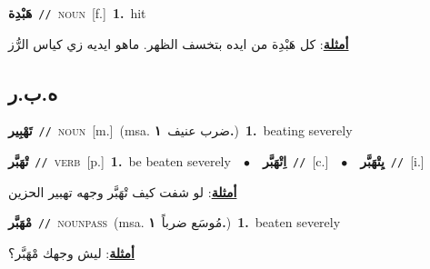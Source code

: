 \documentclass[10pt,a4paper,twoside]{article} %
\begin{document}
\begin{multicols}{2}
{\setlength\topsep{0pt}\textbf{\foreignlanguage{arabic}{هَبْدِة}}\ {\color{gray}\texttt{//}\color{black}}\ \textsc{noun}\ [f.]\ \textbf{1.}~hit\  \begin{flushright}\color{gray}\foreignlanguage{arabic}{\textbf{\underline{\foreignlanguage{arabic}{أمثلة}}}: كل هَبْدِة من ايده بتخسف الظهر. ماهو ايديه زي كياس الرُّز}\end{flushright}\color{black}} \vspace{2mm}

\vspace{-3mm}
\subsection*{\color{blue}\foreignlanguage{arabic}{ه.ب.ر}\color{blue}{}} 

{\setlength\topsep{0pt}\textbf{\foreignlanguage{arabic}{تَهْبِير}}\ {\color{gray}\texttt{//}\color{black}}\ \textsc{noun}\ [m.]\ \color{gray}(msa. \foreignlanguage{arabic}{ضرب عنيف}~\foreignlanguage{arabic}{\textbf{١.}})\color{black}\ \textbf{1.}~beating severely\ } \vspace{2mm}

{\setlength\topsep{0pt}\textbf{\foreignlanguage{arabic}{تْهَبَّر}}\ {\color{gray}\texttt{//}\color{black}}\ \textsc{verb}\ [p.]\ \textbf{1.}~be beaten severely\ \ $\bullet$\ \ \setlength\topsep{0pt}\textbf{\foreignlanguage{arabic}{اِتْهَبَّر}}\ {\color{gray}\texttt{//}\color{black}}\ [c.]\ \ $\bullet$\ \ \setlength\topsep{0pt}\textbf{\foreignlanguage{arabic}{يِتْهَبَّر}}\ {\color{gray}\texttt{//}\color{black}}\ [i.]\  \begin{flushright}\color{gray}\foreignlanguage{arabic}{\textbf{\underline{\foreignlanguage{arabic}{أمثلة}}}: لو شفت كيف تْهَبَّر وجهه تهبير الحزين}\end{flushright}\color{black}} \vspace{2mm}

{\setlength\topsep{0pt}\textbf{\foreignlanguage{arabic}{مْهَبَّر}}\ {\color{gray}\texttt{//}\color{black}}\ \textsc{noun\textunderscore pass}\ \color{gray}(msa. \foreignlanguage{arabic}{مُوسَع ضرباً}~\foreignlanguage{arabic}{\textbf{١.}})\color{black}\ \textbf{1.}~beaten severely\  \begin{flushright}\color{gray}\foreignlanguage{arabic}{\textbf{\underline{\foreignlanguage{arabic}{أمثلة}}}: ليش وجهك مْهَبَّر؟}\end{flushright}\color{black}} \vspace{2mm}


\end{multicols}
\end{document}
